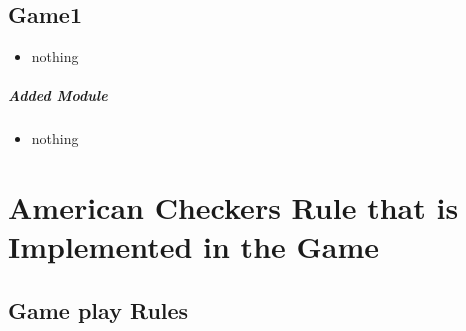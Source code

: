 \documentclass[10pt]{article}
\begin{document}
	\subsection{Game1}	
	\begin{itemize}
	\item nothing
	\end{itemize}	
	
	\subparagraph{Added Module}
	\begin{itemize}
	\item nothing
	\end{itemize}
\newpage
\section{American Checkers Rule that is Implemented in the Game} 
	\subsection{Game play Rules}
\end{document}
